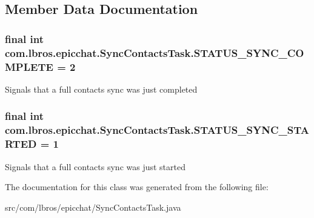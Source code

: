 \subsection{Member Data Documentation}
\hypertarget{classcom_1_1lbros_1_1epicchat_1_1_sync_contacts_task_a09a66dc065eaf8d14c34b93dac145f65}{
\subsubsection[{S\-T\-A\-T\-U\-S\-\_\-\-S\-Y\-N\-C\-\_\-\-C\-O\-M\-P\-L\-E\-T\-E}]{\setlength{\rightskip}{0pt plus 5cm}final int com.\-lbros.\-epicchat.\-Sync\-Contacts\-Task.\-S\-T\-A\-T\-U\-S\-\_\-\-S\-Y\-N\-C\-\_\-\-C\-O\-M\-P\-L\-E\-T\-E = 2\hspace{0.3cm}{\ttfamily [static]}}}\label{classcom_1_1lbros_1_1epicchat_1_1_sync_contacts_task_a09a66dc065eaf8d14c34b93dac145f65}
Signals that a full contacts sync was just completed \hypertarget{classcom_1_1lbros_1_1epicchat_1_1_sync_contacts_task_a0da5abdb285b263735b0d237b8265e97}{
\subsubsection[{S\-T\-A\-T\-U\-S\-\_\-\-S\-Y\-N\-C\-\_\-\-S\-T\-A\-R\-T\-E\-D}]{\setlength{\rightskip}{0pt plus 5cm}final int com.\-lbros.\-epicchat.\-Sync\-Contacts\-Task.\-S\-T\-A\-T\-U\-S\-\_\-\-S\-Y\-N\-C\-\_\-\-S\-T\-A\-R\-T\-E\-D = 1\hspace{0.3cm}{\ttfamily [static]}}}\label{classcom_1_1lbros_1_1epicchat_1_1_sync_contacts_task_a0da5abdb285b263735b0d237b8265e97}
Signals that a full contacts sync was just started 

The documentation for this class was generated from the following file\-:\begin{DoxyCompactItemize}
\item 
src/com/lbros/epicchat/Sync\-Contacts\-Task.\-java\end{DoxyCompactItemize}
